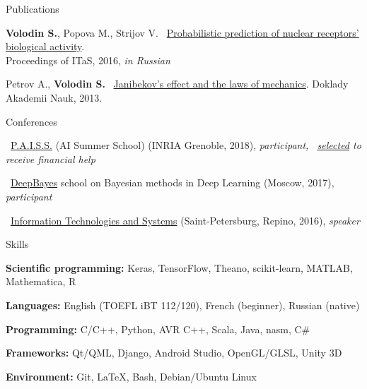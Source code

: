 \documentclass{resume} %
\begin{document}
\begin{rSection}{Publications}
\vspace{-1em}
\item {\bf Volodin S.}, Popova M., Strijov V. \faExternalLink~\href{http://itas2016.iitp.ru/pdf/1570303389.pdf}{Probabilistic prediction of nuclear receptors’ biological activity}.\\ Proceedings of ITaS, 2016, {\em in Russian}
\item Petrov A., {\bf Volodin S.} \faExternalLink~\href{https://link.springer.com/article/10.1134/S1028335813080041}{Janibekov's effect and the laws of mechanics}. Doklady Akademii Nauk, 2013.
\end{rSection}

\newpage

\begin{rSection}{Conferences}
\vspace{-1em}
\item \faExternalLink~\href{https://project.inria.fr/paiss/}{P.A.I.S.S.} (AI Summer School) (INRIA Grenoble, 2018){, \em participant, \faExternalLink~\href{http://www.europe.naverlabs.com/Blog/Students-at-PAISS}{selected} to receive financial help }
\item \faExternalLink~\href{http://deepbayes.ru}{DeepBayes} school on Bayesian methods in Deep Learning (Moscow, 2017){, \em participant}
\item \faExternalLink~\href{http://iitp.ru/en/conferences/itas}{Information Technologies and Systems} (Saint-Petersburg, Repino, 2016){, \em speaker}
\end{rSection}

\begin{rSection}{Skills}
	\vspace{-1em}
	\item {\bf Scientific programming:} Keras, TensorFlow, Theano, scikit-learn, MATLAB, Mathematica, R
	\item {\bf Languages:} English (TOEFL iBT 112/120), French (beginner), Russian (native)
	\item {\bf Programming:} C/C++, Python, AVR C++, Scala, Java, nasm, C\#
	\item {\bf Frameworks:} Qt/QML, Django, Android Studio, OpenGL/GLSL, Unity 3D
	\item {\bf Environment:} Git, \LaTeX, Bash, Debian/Ubuntu Linux
\end{rSection}
\end{document}
